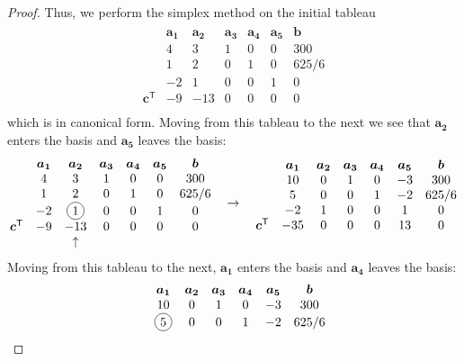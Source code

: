 \documentclass[12pt]{article}
\newcommand*\circled[1]{\tikz[baseline=(char.base)]{
            \node[shape=circle,draw,inner sep=2pt] (char) {#1};}}
\theoremstyle{definition}
\newcommand{\vc}[1]{\boldsymbol{#1}}
\newcommand{\tran}{\mathsf{T}}
\begin{document}
\begin{proof}
  Thus, we perform the simplex method on the initial tableau
  \begin{align*}
    \begin{matrix}
      & \vc{a_1} & \vc{a_2} & \vc{a_3} & \vc{a_4} & \vc{a_5} & \vc{b} \\
      & 4 & 3 & 1 & 0 & 0 & 300 \\
      & 1 & 2 & 0 & 1 & 0 & 625/6 \\
      & -2 & 1 & 0 & 0 & 1 & 0 \\
      \vc{c}^\tran & -9 & -13 & 0 & 0 & 0 & 0\\
    \end{matrix}
  \end{align*}
  which is in canonical form. Moving from this tableau to the next we see that
  $\vc{a_2}$ enters the basis and $\vc{a_5}$ leaves the basis:
  \begin{align*}
    \begin{matrix}
      & \vc{a_1} & \vc{a_2} & \vc{a_3} & \vc{a_4} & \vc{a_5} & \vc{b} \\
      & 4 & 3 & 1 & 0 & 0 & 300 \\
      & 1 & 2 & 0 & 1 & 0 & 625/6 \\
      & -2 & \circled{1} & 0 & 0 & 1 & 0 \\
      \vc{c}^\tran & -9 & -13 & 0 & 0 & 0 & 0\\
      &&\uparrow &&&
    \end{matrix}
    \quad
    \to
    \quad
    \begin{matrix}
      & \vc{a_1} & \vc{a_2} & \vc{a_3} & \vc{a_4} & \vc{a_5} & \vc{b} \\
      & 10 & 0 & 1 & 0 & -3 & 300 \\
      & 5 & 0 & 0 & 1 & -2 & 625/6 \\
      & -2 & 1 & 0 & 0 & 1 & 0 \\
      \vc{c}^\tran & -35 & 0 & 0 & 0 & 13 & 0\\
      && &&&
    \end{matrix}
  \end{align*}
  Moving from this tableau to the next, $\vc{a_1}$ enters the basis and $\vc{a_4}$ leaves the basis:
  \begin{align*}
    \begin{matrix}
      & \vc{a_1} & \vc{a_2} & \vc{a_3} & \vc{a_4} & \vc{a_5} & \vc{b} \\
      & 10 & 0 & 1 & 0 & -3 & 300 \\
      & \circled{5} & 0 & 0 & 1 & -2 & 625/6 \\

\end{matrix}
\end{align*}
\end{proof}
\end{document}
